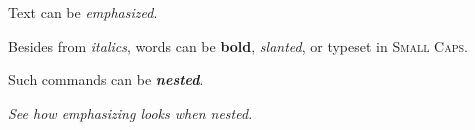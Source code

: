 \documentclass{article}
\begin{document}
Text can be \emph{emphasized}.

Besides from \textit{italics}, words can be \textbf{bold},
\textsl{slanted}, or typeset in \textsc{Small Caps}.

Such commands can be \textit{\textbf{nested}}.

\emph{See how \emph{emphasizing} looks when nested.}
\end{document}
